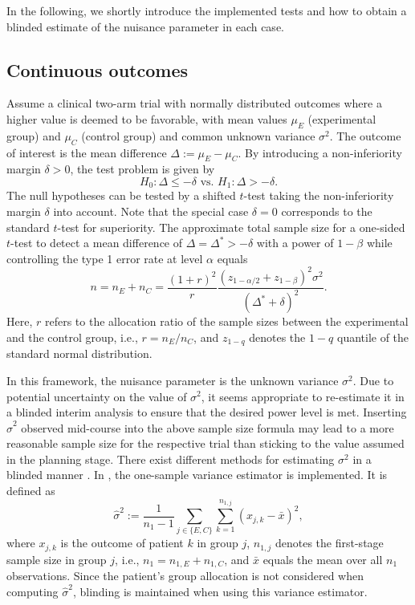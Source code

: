 In the following, we shortly introduce the implemented tests and how to
obtain a blinded estimate of the nuisance parameter in each case.

\hypertarget{continuous-outcomes}{%
\subsection{Continuous outcomes}\label{continuous-outcomes}}

Assume a clinical two-arm trial with normally distributed outcomes where
a higher value is deemed to be favorable, with mean values \(\mu_E\)
(experimental group) and \(\mu_C\) (control group) and common unknown
variance \(\sigma^2\). The outcome of interest is the mean difference
\(\Delta := \mu_E - \mu_C\). By introducing a non-inferiority margin
\(\delta>0\), the test problem is given by
\[H_0: \Delta \leq - \delta \text{ vs. } H_1: \Delta > -\delta.\] The
null hypotheses can be tested by a shifted \(t\)-test taking the
non-inferiority margin \(\delta\) into account. Note that the special
case \(\delta=0\) corresponds to the standard \(t\)-test for
superiority. The approximate total sample size for a one-sided
\(t\)-test to detect a mean difference of
\(\Delta = \Delta^* > -\delta\) with a power of \(1-\beta\) while
controlling the type 1 error rate at level \(\alpha\) equals
\[n=n_E+n_C=\frac{\left(1+r\right)^2}{r} \frac{\left(z_{1-\alpha/2} + z_{1-\beta}\right)^2 \sigma^2}{\left(\Delta^*+\delta\right)^2}.\]
Here, \(r\) refers to the allocation ratio of the sample sizes between
the experimental and the control group, i.e., \(r = n_E / n_C\), and
\(z_{1-q}\) denotes the \(1-q\) quantile of the standard normal
distribution.

In this framework, the nuisance parameter is the unknown variance
\(\sigma^2\). Due to potential uncertainty on the value of \(\sigma^2\),
it seems appropriate to re-estimate it in a blinded interim analysis to
ensure that the desired power level is met. Inserting
\(\widehat{\sigma}^2\) observed mid-course into the above sample size
formula may lead to a more reasonable sample size for the respective
trial than sticking to the value assumed in the planning stage. There
exist different methods for estimating \(\sigma^2\) in a blinded manner
\citep{Zucker1999}. In , the one-sample variance
estimator is implemented. It is defined as \[
\widehat{\sigma}^2 := \frac{1}{n_1-1} \sum_{j \in \{E, C \}} \sum_{k=1}^{n_{1,j}}
\left( x_{j,k} - \bar{x} \right)^2,
\] where \(x_{j,k}\) is the outcome of patient \(k\) in group \(j\),
\(n_{1,j}\) denotes the first-stage sample size in group \(j\), i.e.,
\(n_1 = n_{1,E} + n_{1,C}\), and \(\bar{x}\) equals the mean over all
\(n_1\) observations. Since the patient's group allocation is not
considered when computing \(\widehat{\sigma}^2\), blinding is maintained
when using this variance estimator.

